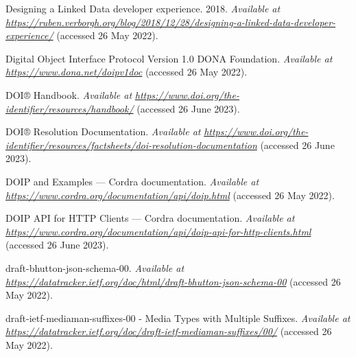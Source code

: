 \begin{CSLReferences}{1}{0}
\leavevmode{}%
Designing a Linked Data developer experience. 2018. \emph{Available at} \href{https://ruben.verborgh.org/blog/2018/12/28/designing-a-linked-data-developer-experience/}{\emph{https://ruben.verborgh.org/blog/2018/12/28/designing-a-linked-data-developer-experience/}} (accessed 26 May 2022).

\leavevmode{}%
Digital Object Interface Protocol Version 1.0 \textbar{} DONA Foundation. \emph{Available at} \href{https://www.dona.net/doipv1doc}{\emph{https://www.dona.net/doipv1doc}} (accessed 26 May 2022).

\leavevmode{}%
DOI® Handbook. \emph{Available at} \href{https://www.doi.org/the-identifier/resources/handbook/}{\emph{https://www.doi.org/the-identifier/resources/handbook/}} (accessed 26 June 2023).

\leavevmode{}%
DOI® Resolution Documentation. \emph{Available at} \href{https://www.doi.org/the-identifier/resources/factsheets/doi-resolution-documentation}{\emph{https://www.doi.org/the-identifier/resources/factsheets/doi-resolution-documentation}} (accessed 26 June 2023).

\leavevmode{}%
DOIP and Examples --- Cordra documentation. \emph{Available at} \href{https://www.cordra.org/documentation/api/doip.html}{\emph{https://www.cordra.org/documentation/api/doip.html}} (accessed 26 May 2022).

\leavevmode{}%
DOIP API for HTTP Clients --- Cordra documentation. \emph{Available at} \href{https://www.cordra.org/documentation/api/doip-api-for-http-clients.html}{\emph{https://www.cordra.org/documentation/api/doip-api-for-http-clients.html}} (accessed 26 June 2023).

\leavevmode{}%
draft-bhutton-json-schema-00. \emph{Available at} \href{https://datatracker.ietf.org/doc/html/draft-bhutton-json-schema-00}{\emph{https://datatracker.ietf.org/doc/html/draft-bhutton-json-schema-00}} (accessed 26 May 2022).

\leavevmode{}%
draft-ietf-mediaman-suffixes-00 - Media Types with Multiple Suffixes. \emph{Available at} \href{https://datatracker.ietf.org/doc/draft-ietf-mediaman-suffixes/00/}{\emph{https://datatracker.ietf.org/doc/draft-ietf-mediaman-suffixes/00/}} (accessed 26 May 2022).


\end{CSLReferences}
